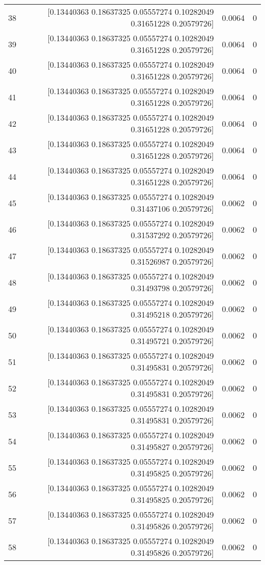 \begin{longtable}{lrrr}
38 & [0.13440363 0.18637325 0.05557274 0.10282049 0.31651228 0.20579726] & 0.0064 & 0 \\
39 & [0.13440363 0.18637325 0.05557274 0.10282049 0.31651228 0.20579726] & 0.0064 & 0 \\
40 & [0.13440363 0.18637325 0.05557274 0.10282049 0.31651228 0.20579726] & 0.0064 & 0 \\
41 & [0.13440363 0.18637325 0.05557274 0.10282049 0.31651228 0.20579726] & 0.0064 & 0 \\
42 & [0.13440363 0.18637325 0.05557274 0.10282049 0.31651228 0.20579726] & 0.0064 & 0 \\
43 & [0.13440363 0.18637325 0.05557274 0.10282049 0.31651228 0.20579726] & 0.0064 & 0 \\
44 & [0.13440363 0.18637325 0.05557274 0.10282049 0.31651228 0.20579726] & 0.0064 & 0 \\
45 & [0.13440363 0.18637325 0.05557274 0.10282049 0.31437106 0.20579726] & 0.0062 & 0 \\
46 & [0.13440363 0.18637325 0.05557274 0.10282049 0.31537292 0.20579726] & 0.0062 & 0 \\
47 & [0.13440363 0.18637325 0.05557274 0.10282049 0.31526987 0.20579726] & 0.0062 & 0 \\
48 & [0.13440363 0.18637325 0.05557274 0.10282049 0.31493798 0.20579726] & 0.0062 & 0 \\
49 & [0.13440363 0.18637325 0.05557274 0.10282049 0.31495218 0.20579726] & 0.0062 & 0 \\
50 & [0.13440363 0.18637325 0.05557274 0.10282049 0.31495721 0.20579726] & 0.0062 & 0 \\
51 & [0.13440363 0.18637325 0.05557274 0.10282049 0.31495831 0.20579726] & 0.0062 & 0 \\
52 & [0.13440363 0.18637325 0.05557274 0.10282049 0.31495831 0.20579726] & 0.0062 & 0 \\
53 & [0.13440363 0.18637325 0.05557274 0.10282049 0.31495831 0.20579726] & 0.0062 & 0 \\
54 & [0.13440363 0.18637325 0.05557274 0.10282049 0.31495827 0.20579726] & 0.0062 & 0 \\
55 & [0.13440363 0.18637325 0.05557274 0.10282049 0.31495825 0.20579726] & 0.0062 & 0 \\
56 & [0.13440363 0.18637325 0.05557274 0.10282049 0.31495825 0.20579726] & 0.0062 & 0 \\
57 & [0.13440363 0.18637325 0.05557274 0.10282049 0.31495826 0.20579726] & 0.0062 & 0 \\
58 & [0.13440363 0.18637325 0.05557274 0.10282049 0.31495826 0.20579726] & 0.0062 & 0 \\

\end{longtable}
